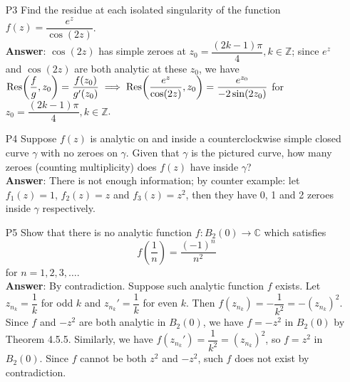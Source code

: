 \documentclass{article}
\begin{document}
\begin{itemize}
      \item [P3] Find the residue at each isolated singularity of the function $f(z)=\dfrac{e^z}{\cos(2z)}$.\\
            \textbf{Answer}: $\cos(2z)$ has simple zeroes at $z_0=\dfrac{(2k-1)\pi}{4},k\in\mathbb{Z}$; since $e^z$ and $\cos(2z)$ are both analytic at these $z_0$, we have $\Res(\dfrac{f}{g},z_0)=\dfrac{f(z_0)}{g'(z_0)}\implies\Res(\dfrac{e^z}{\cos(2z)},z_0)=\dfrac{e^{z_0}}{-2\sin(2z_0)}$ for $z_0=\dfrac{(2k-1)\pi}{4},k\in\mathbb{Z}$.
      \item [P4] Suppose $f(z)$ is analytic on and inside a counterclockwise simple closed curve $\gamma$ with no zeroes on $\gamma$. Given that $\gamma$ is the pictured curve, how many zeroes (counting multiplicity) does $f(z)$ have inside $\gamma$?\\
            \textbf{Answer}: There is not enough information; by counter example: let $f_1(z)=1$, $f_2(z)=z$ and $f_3(z)=z^2$, then they have 0, 1 and 2 zeroes inside $\gamma$ respectively.
      \item [P5] Show that there is no analytic function $f:B_2(0)\rightarrow\mathbb{C}$ which satisfies \[f\left(\dfrac{1}{n}\right)=\dfrac{(-1)^n}{n^2}\] for $n=1,2,3,\ldots$.\\
            \textbf{Answer}: By contradiction. Suppose such analytic function $f$ exists. Let $z_{n_k}=\dfrac{1}{k}$ for odd $k$ and $z_{n_k}'=\dfrac{1}{k}$ for even $k$. Then $f(z_{n_k})=-\dfrac{1}{k^2}=-(z_{n_k})^2$. Since $f$ and $-z^2$ are both analytic in $B_2(0)$, we have $f=-z^2$ in $B_2(0)$ by Theorem 4.5.5. Similarly, we have $f(z_{n_k}')=\dfrac{1}{k^2}=(z_{n_k})^2$, so $f=z^2$ in $B_2(0)$. Since $f$ cannot be both $z^2$ and $-z^2$, such $f$ does not exist by contradiction.
\end{itemize}
\end{document}
